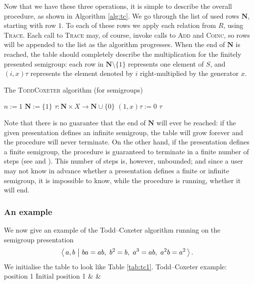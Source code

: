 Now that we have these three operations, it is simple to describe the overall
procedure, as shown in Algorithm \ref{alg:tc}.  We go through the list of used
rows $\mathbf{N}$, starting with row $1$.  To each
of these rows we apply each relation from $R$, using \textsc{Trace}.  Each call
to \textsc{Trace} may, of course, invoke calls to \textsc{Add} and
\textsc{Coinc}, so rows will be appended to the list as the algorithm
progresses.  When the end of $\mathbf{N}$ is reached, the table should
completely describe the multiplication for the finitely presented semigroup:
each row in $\mathbf{N} \setminus \{1\}$ represents one element of $S$, and
$(i, x)\tau$ represents the element denoted by $i$ right-multiplied by the
generator $x$.

\begin{algorithm}
\caption{The \textsc{ToddCoxeter} algorithm (for semigroups)}
\label{alg:tc}
\begin{algorithmic}[1]
\State $n := 1$
\State $\mathbf{N} := \{1\}$
\State $\tau : \mathbf{N} \times X \to \mathbf{N} \cup \{0\}$
  \State $(1, x)\tau := 0$
\EndFor
{}
    \State {}
  \EndFor
\EndFor
\State \Return $\tau$
\EndProcedure
\end{algorithmic}
\end{algorithm}

Note that there is no guarantee that the end of $\mathbf{N}$ will ever be
reached: if the given presentation defines an infinite semigroup, the table will
grow forever and the procedure will never terminate.  On the other hand, if the
presentation defines a finite semigroup, the procedure is guaranteed to
terminate in a finite number of steps (see
\cite[Theorem 5.5]{cgt} and \cite[Theorem 3]{beetham_campbell_1976}).
This number of steps is, however, unbounded; and since a user may
not know in advance whether a presentation defines a finite or infinite
semigroup, it is impossible to
know, while the procedure is running, whether it will end.

\subsubsection{An example}
We now give an example of the Todd--Coxeter algorithm running on the semigroup
presentation
$$\pres{a, b}{ba=ab,\ b^2=b,\ a^3=ab,\ a^2b=a^2}.$$
We initialise the table to look like Table \ref{tab:tc1}.
{Todd--Coxeter example: position 1}
{Initial position}
{ 1 & & \\ }

